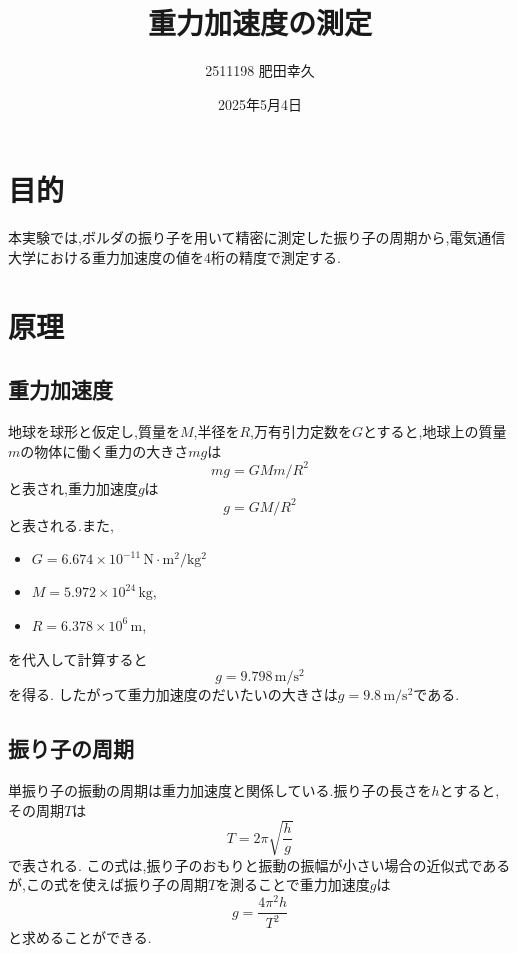 \documentclass{jarticle}
\title{重力加速度の測定}
\author{2511198 肥田幸久}
\date{2025年5月4日}
\begin{document}
\maketitle

\section{目的}

本実験では,ボルダの振り子を用いて精密に測定した振り子の周期から,電気通信大学における重力加速度の値を4桁の精度で測定する.


\section{原理}

\subsection{重力加速度}

地球を球形と仮定し,質量を$M$,半径を$R$,万有引力定数を$G$とすると,地球上の質量$m$の物体に働く重力の大きさ$mg$は
\begin{equation}
  mg=GMm/R^2
\end{equation}
と表され,重力加速度$g$は
\begin{equation}
  g=GM/R^2
\end{equation}
と表される.また,
\begin{itemize}
  \item $G=6.674\times10^{-11}\,\mathrm{N\cdot m^2/kg^2}$
  \item $M=5.972\times10^{24}\,\mathrm{kg}$,
  \item $R=6.378\times10^6\,\mathrm{m}$,
\end{itemize}
を代入して計算すると
\begin{equation}
  g=9.798\,\mathrm{m/s^2}
\end{equation}
を得る.
したがって重力加速度のだいたいの大きさは$g=9.8\,\mathrm{m/s^2}$である.

\subsection{振り子の周期}

単振り子の振動の周期は重力加速度と関係している.振り子の長さを$h$とすると,その周期$T$は
\begin{equation}
  T=2\pi\sqrt{\frac{h}{g}}
\end{equation}
で表される.
この式は,振り子のおもりと振動の振幅が小さい場合の近似式であるが,この式を使えば振り子の周期$T$を測ることで重力加速度$g$は
\begin{equation}
  g=\frac{4\pi^2h}{T^2}
\end{equation}
と求めることができる.
\end{document}
